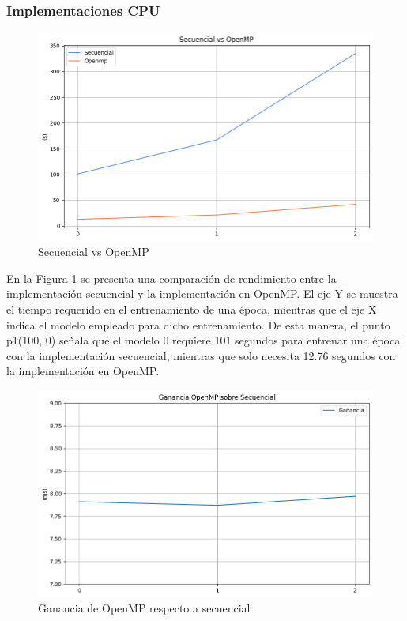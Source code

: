 \subsubsection{Implementaciones CPU}

\begin{figure}[H]
	\centering
	\includegraphics[scale=0.5]{imagenes/sec_openmp.png}  
	\caption{Secuencial vs OpenMP}
	\label{fig:sec_openmp}
\end{figure}

En la Figura \ref{fig:sec_openmp} se presenta una comparación de rendimiento entre la implementación secuencial y la implementación en OpenMP. El eje Y se muestra el tiempo requerido en el entrenamiento de una época, mientras que el eje X indica el modelo empleado para dicho entrenamiento. De esta manera, el punto p1(100, 0) señala que el modelo 0 requiere 101 segundos para entrenar una época con la implementación secuencial, mientras que solo necesita 12.76 segundos con la implementación en OpenMP.

\begin{figure}[H]
	\centering
	\includegraphics[scale=0.5]{imagenes/ganancia_sec_openmp.png}  
	\caption{Ganancia de OpenMP respecto a secuencial}
	\label{fig:ganancia_sec_openmp}
\end{figure}

